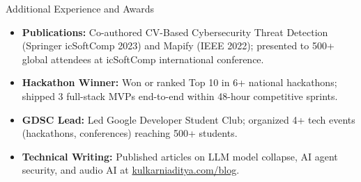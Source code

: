 \documentclass[]{mcdowellcv}
\begin{document}
\begin{cvsection}{Additional Experience and Awards}
  \begin{cvsubsection}{}{}{}
    \begin{itemize}
      \item \textbf{Publications:} Co-authored CV-Based Cybersecurity Threat Detection (Springer icSoftComp 2023) and Mapify (IEEE 2022); presented to 500+ global attendees at icSoftComp international conference.
      \item \textbf{Hackathon Winner:} Won or ranked Top 10 in 6+ national hackathons; shipped 3 full-stack MVPs end-to-end within 48-hour competitive sprints.
      \item \textbf{GDSC Lead:} Led Google Developer Student Club; organized 4+ tech events (hackathons, conferences) reaching 500+ students.
      \item \textbf{Technical Writing:} Published articles on LLM model collapse, AI agent security, and audio AI at \href{https://www.kulkarniaditya.com/blog}{kulkarniaditya.com/blog}.
    \end{itemize}
  \end{cvsubsection}
\end{cvsection}
\end{document}

